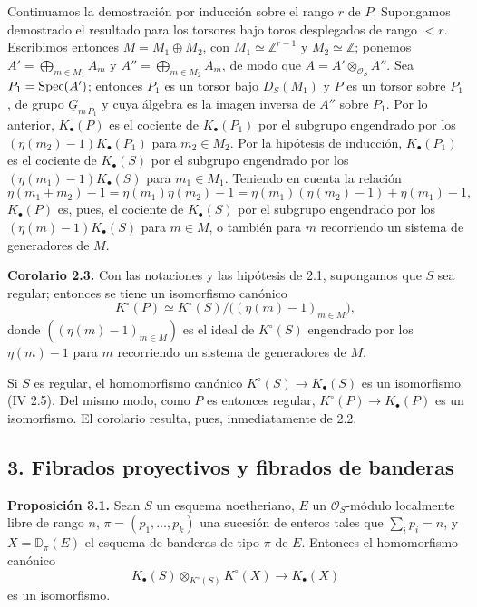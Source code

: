 Continuamos la demostración por inducción sobre el rango $r$ de $P$. Supongamos demostrado el resultado para los torsores bajo toros desplegados de rango $<r$. Escribimos entonces $M=M_1\oplus M_2$, con $M_1\simeq\mathbb Z^{r-1}$ y $M_2\simeq\mathbb Z$; ponemos $A'=\bigoplus_{m\in M_1}A_m$ y $A''=\bigoplus_{m\in M_2}A_m$, de modo que $A=A'\otimes_{\mathcal O_S}A''$. Sea $P_1=\operatorname{Spec}(A')$; entonces $P_1$ es un torsor bajo $D_S(M_1)$ y $P$ es un torsor sobre $P_1$, de grupo $\underline G_{m\,P_1}$ y cuya álgebra es la imagen inversa de $A''$ sobre $P_1$. Por lo anterior, $K_\bullet(P)$ es el cociente de $K_\bullet(P_1)$ por el subgrupo engendrado por los $(\eta(m_2)-1)K_\bullet(P_1)$ para $m_2\in M_2$. Por la hipótesis de inducción, $K_\bullet(P_1)$ es el cociente de $K_\bullet(S)$ por el subgrupo engendrado por los $(\eta(m_1)-1)K_\bullet(S)$ para $m_1\in M_1$. Teniendo en cuenta la relación
\[
\eta(m_1+m_2)-1=\eta(m_1)\eta(m_2)-1
=\eta(m_1)(\eta(m_2)-1)+\eta(m_1)-1,
\]
$K_\bullet(P)$ es, pues, el cociente de $K_\bullet(S)$ por el subgrupo engendrado por los $(\eta(m)-1)K_\bullet(S)$ para $m\in M$, o también para $m$ recorriendo un sistema de generadores de $M$.

\textbf{Corolario 2.3.} Con las notaciones y las hipótesis de 2.1, supongamos que $S$ sea regular; entonces se tiene un isomorfismo canónico
\[
K^\circ(P)\simeq K^\circ(S)/\bigl((\eta(m)-1)_{m\in M}\bigr),
\]
donde $((\eta(m)-1)_{m\in M})$ es el ideal de $K^\circ(S)$ engendrado por los $\eta(m)-1$ para $m$ recorriendo un sistema de generadores de $M$.

Si $S$ es regular, el homomorfismo canónico $K^\circ(S)\to K_\bullet(S)$ es un isomorfismo (IV 2.5). Del mismo modo, como $P$ es entonces regular, $K^\circ(P)\to K_\bullet(P)$ es un isomorfismo. El corolario resulta, pues, inmediatamente de 2.2.

\subsection*{3. Fibrados proyectivos y fibrados de banderas}

\textbf{Proposición 3.1.} Sean $S$ un esquema noetheriano, $E$ un $\mathcal O_S$-módulo localmente libre de rango $n$, $\pi=(p_1,\ldots,p_k)$ una sucesión de enteros tales que $\sum_i p_i=n$, y $X=\mathbb D_\pi(E)$ el esquema de banderas de tipo $\pi$ de $E$. Entonces el homomorfismo canónico
\[
K_\bullet(S)\otimes_{K^\circ(S)}K^\circ(X)\longrightarrow K_\bullet(X)
\]
es un isomorfismo.

